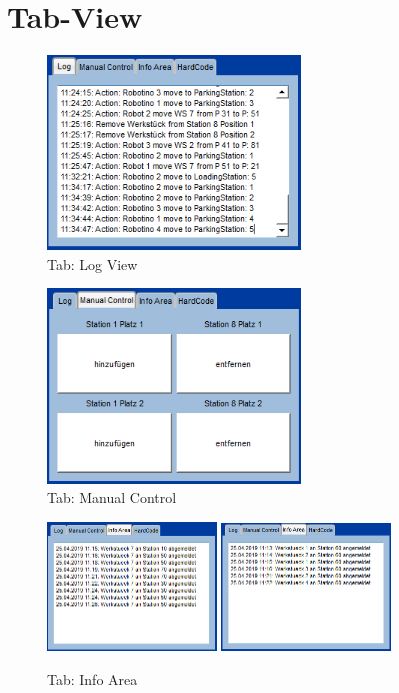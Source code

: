\section{Tab-View}

\begin{figure}[htb]
    \centering
    \includegraphics[width=0.6\textwidth]{Abbildungen/Log.png}
    \caption{Tab: Log View}		
    \label{fig:Log}
\end{figure}

\begin{figure}[htb]
    \centering
    \includegraphics[width=0.6\textwidth]{Abbildungen/ManualControl.png}
    \caption{Tab: Manual Control}		
    \label{fig:ManualControl}
\end{figure}

\begin{figure}[htb]
    \centering
    \includegraphics[width=0.4\textwidth]{Abbildungen/TimestampsWerkstueck.png}
    \includegraphics[width=0.4\textwidth]{Abbildungen/TimestampsStation.png}
    \caption{Tab: Info Area}		
    \label{fig:InfoArea}
\end{figure}

